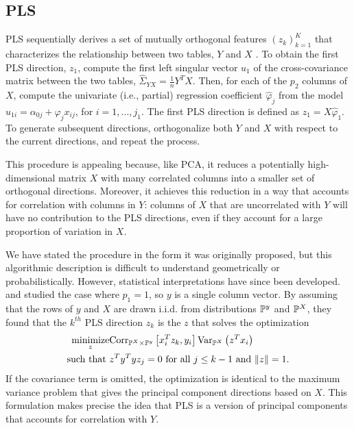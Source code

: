 \documentclass{article}
\begin{document}
\subsection{PLS}
\label{subsec:PLS}

PLS sequentially derives a set of mutually orthogonal features
$\left(z_{k}\right)_{k = 1}^{K}$ that characterizes the relationship between two
tables, $Y$ and $X$ \citep{wold1985partial}. To obtain the first PLS direction,
$z_{1}$, compute the first left singular vector $u_{1}$ of the cross-covariance
matrix between the two tables, $\hat{\Sigma}_{YX} = \frac{1}{n}Y^{T}X$. Then,
for each of the $p_{2}$ columns of $X$, compute the univariate (i.e., partial)
regression coefficient $\hat{\varphi}_{j}$ from the model $u_{1i} = \alpha_{0j}
+ \varphi_{j}x_{ij}$, for $i = 1, \dots, j_{1}$. The first PLS direction is
defined as $z_{1} = X\hat{\varphi}_{1}$. To generate subsequent directions,
orthogonalize both $Y$ and $X$ with respect to the current directions, and
repeat the process.

This procedure is appealing because, like PCA, it reduces a potentially
high-dimensional matrix $X$ with many correlated columns into a
smaller set of orthogonal directions. Moreover, it achieves this
reduction in a way that accounts for correlation with columns in
$Y$: columns of $X$ that are uncorrelated with $Y$
will have no contribution to the PLS directions, even if they account
for a large proportion of variation in $X$.

We have stated the procedure in the form it was originally proposed, but this
algorithmic description is difficult to understand geometrically or
probabilistically. However, statistical interpretations have since been
developed. \citep{frank1993statistical} and \citep{stone1990continuum} studied
the case where $p_{1} = 1$, so $y$ is a single column vector. By assuming that
the rows of $y$ and $X$ are drawn i.i.d. from distributions $\P^{y}$ and
$\P^{X}$, they found that the $k^{th}$ PLS direction $z_{k}$ is the $z$ that
solves the optimization
\begin{align*}
\maximize_{z} & \Corrsubarg{\P^{X} \times \P^{y}}{x_{i}^{T}z_{k},
y_{i}}\Varsubarg{\P^{X}}{z^{T}x_i} \\
\text{such that }&z^{T}y^{T}y z_{j} = 0 \text{ for all }j
\leq k - 1 \text{ and }
\|z\| = 1.
\end{align*}
If the covariance term is omitted, the optimization is identical to the maximum
variance problem that gives the principal component directions based on $X$.
This formulation makes precise the idea that PLS is a version of principal
components that accounts for correlation with $Y$.
\end{document}
